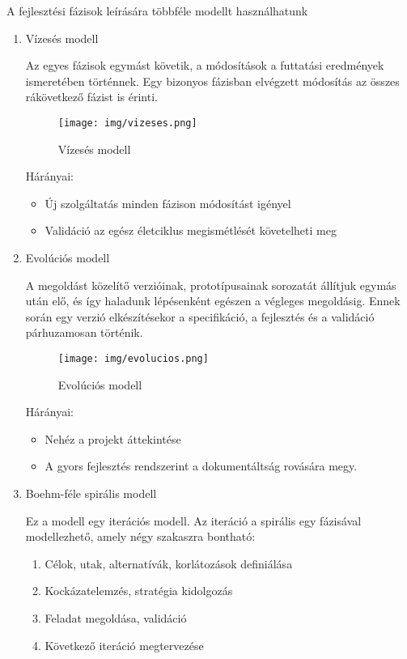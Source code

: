 \documentclass[margin=0px]{article}
\begin{document}
		A fejlesztési fázisok leírására többféle modellt használhatunk
		\begin{enumerate}
			\item Vízesés modell
			
				Az egyes fázisok egymást követik, a
				módosítások a futtatási eredmények ismeretében történnek. Egy bizonyos
				fázisban elvégzett módosítás az összes rákövetkező fázist is érinti.
				
				\begin{figure}[H]
					\centering
					\texttt{[image: img/vizeses.png]}
					\caption{Vízesés modell}
					\label{fig:vizeses}
				\end{figure}
				
				Hárányai: 
					\begin{itemize}
						\item Új szolgáltatás minden fázison módosítást igényel
						\item Validáció az egész életciklus megismétlését követelheti meg
					\end{itemize}
			\item Evolúciós modell
			
				A megoldást közelítő verzióinak, prototípusainak sorozatát
				állítjuk egymás után elő, és így haladunk lépésenként egészen a végleges
				megoldásig. Ennek során egy verzió elkészítésekor a specifikáció, a fejlesztés és a validáció párhuzamosan történik.
				
				\begin{figure}[H]
					\centering
					\texttt{[image: img/evolucios.png]}
					\caption{Evolúciós modell}
					\label{fig:evolucios}
				\end{figure}
				
				Hárányai: 
				\begin{itemize}
					\item Nehéz a projekt áttekintése
					\item A gyors fejlesztés rendszerint a dokumentáltság rovására megy.
				\end{itemize}
			\item Boehm-féle spirális modell
			
				Ez a modell egy iterációs modell. Az iteráció a spirális egy
				fázisával modellezhető, amely négy szakaszra bontható:
				\begin{enumerate}
					\item Célok, utak, alternatívák, korlátozások definiálása
					\item Kockázatelemzés, stratégia kidolgozás
					\item Feladat megoldása, validáció
					\item Következő iteráció megtervezése
				\end{enumerate}
				

\end{enumerate}
\end{document}
